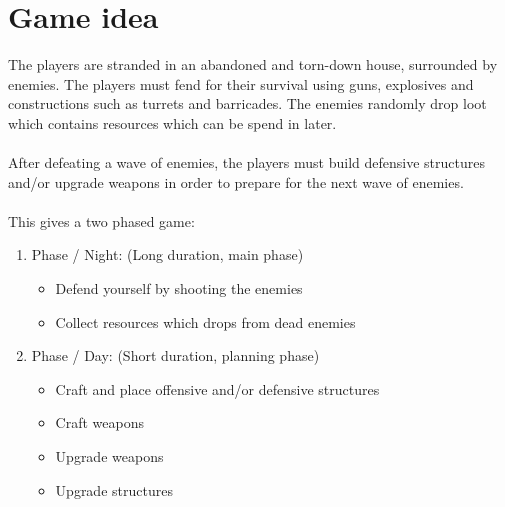 \section{Game idea}
The players are stranded in an abandoned and torn-down house, surrounded by enemies. The players must fend for their survival using guns, explosives and constructions such as turrets and barricades. The enemies randomly drop loot which contains resources which can be spend in later.\\\\
After defeating a wave of enemies, the players must build defensive structures and/or upgrade weapons in order to prepare for the next wave of enemies.\\\\
This gives a two phased game:
\begin{enumerate}
\item Phase / Night: (Long duration, main phase)

\begin{itemize}
\item Defend yourself by shooting the enemies
\item Collect resources which drops from dead enemies
\end{itemize}

\item Phase / Day: (Short duration, planning phase)

\begin{itemize}
\item Craft and place offensive and/or defensive structures
\item Craft weapons
\item Upgrade weapons 
\item Upgrade structures 

\end{itemize}	
\end{enumerate}